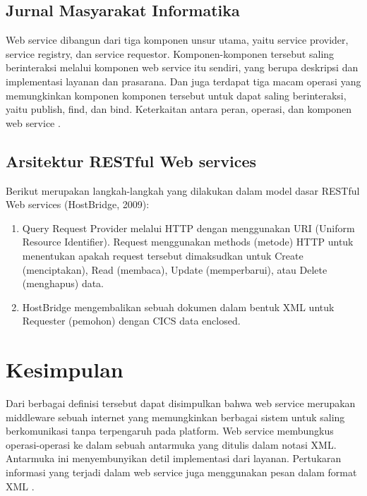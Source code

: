 \subsection{Jurnal Masyarakat Informatika}

	Web service dibangun dari tiga komponen unsur utama, yaitu service provider, service registry, dan service requestor. Komponen-komponen tersebut saling berinteraksi melalui komponen web service itu sendiri, yang berupa deskripsi dan implementasi layanan dan prasarana. Dan juga terdapat tiga macam operasi yang memungkinkan komponen komponen tersebut untuk dapat saling berinteraksi, yaitu publish, find, dan bind. Keterkaitan antara peran, operasi, dan komponen web service \cite{saputra2integrasi}.

\subsection{Arsitektur RESTful Web services}

	Berikut merupakan langkah-langkah yang dilakukan dalam model dasar RESTful Web services (HostBridge, 2009):
\begin{enumerate}
\item Query Request Provider melalui HTTP dengan menggunakan URI (Uniform Resource Identifier). Request menggunakan methods (metode) HTTP untuk menentukan apakah request tersebut dimaksudkan untuk Create (menciptakan), Read (membaca), Update (memperbarui), atau Delete (menghapus) data.
\item HostBridge mengembalikan sebuah dokumen dalam bentuk XML untuk Requester (pemohon) dengan CICS data enclosed\cite{arsana2014rancang}.
\end{enumerate}



\section{Kesimpulan}

	Dari berbagai definisi tersebut dapat disimpulkan bahwa web service merupakan middleware sebuah internet yang memungkinkan berbagai sistem untuk saling berkomunikasi tanpa terpengaruh pada platform. Web service membungkus operasi-operasi ke dalam sebuah antarmuka yang ditulis dalam notasi XML. Antarmuka ini menyembunyikan detil implementasi dari layanan. Pertukaran informasi yang terjadi dalam web service juga menggunakan pesan dalam format XML \cite{saputra2integrasi}.


